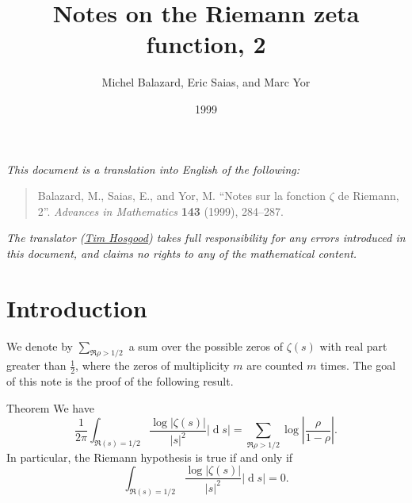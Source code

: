 \documentclass[
  letterpaper,
  DIV=11,
  numbers=noendperiod]{scrartcl}
\title{Notes on the Riemann zeta function, 2}
\author{Michel Balazard, Eric Saias, and Marc Yor}
\date{1999}
\renewcommand*\contentsname{Table of contents}
\newcommand\contentsname{Table of contents}
\theoremstyle{remark}
\begin{document}
\maketitle

\renewcommand*\contentsname{Table of contents}
{
\setcounter{tocdepth}{3}
\tableofcontents
}

\emph{This document is a translation into English of the following:}

\begin{quote}
Balazard, M., Saias, E., and Yor, M. ``Notes sur la fonction \(\zeta\)
de Riemann, 2''. \emph{Advances in Mathematics} \textbf{143} (1999),
284--287.
\end{quote}

\emph{The translator (\href{https://thosgood.net}{Tim Hosgood}) takes
full responsibility for any errors introduced in this document, and
claims no rights to any of the mathematical content.}

\tableofcontents

\providecommand{\scr}[1]{{\mathscr{#1}}}
\renewcommand{\cal}[1]{{\mathcal{#1}}}
\renewcommand{\frak}[1]{{\mathfrak{#1}}}
\renewcommand{\geq}{\geqslant}
\renewcommand{\leq}{\leqslant}

\newcommand{\dd}{\operatorname{d}\!}

\section*{Introduction}\label{introduction}


We denote by \(\sum_{\Re\rho>1/2}\) a sum over the possible zeros of
\(\zeta(s)\) with real part greater than \(\frac12\), where the zeros of
multiplicity \(m\) are counted \(m\) times. The goal of this note is the
proof of the following result.

\begin{itenv}{Theorem}
We have \[
  \frac{1}{2\pi}\int_{\Re(s)=1/2} \frac{\log|\zeta(s)|}{|s|^2}|\operatorname{d}\!s|
  = \sum_{\Re\rho>1/2} \log\left|\frac{\rho}{1-\rho}\right|.
\tag{1}
\] In particular, the Riemann hypothesis is true if and only if \[
  \int_{\Re(s)=1/2} \frac{\log|\zeta(s)|}{|s|^2}|\operatorname{d}\!s| = 0.
\]

\end{itenv}
\end{document}
